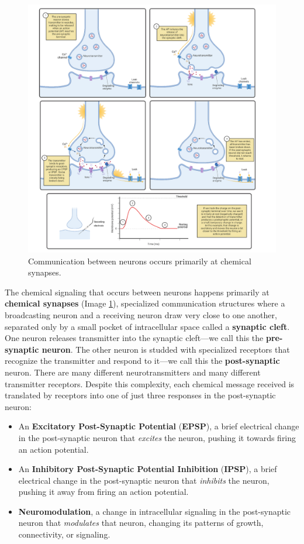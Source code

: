 \documentclass[
]{book}
\begin{document}
\begin{figure}

{\centering \includegraphics[width=0.9\linewidth]{images/ch02/02_02} 

}

\caption{Communication between neurons occurs primarily at chemical synapses.}\label{fig:ch02-02}
\end{figure}

The chemical signaling that occurs between neurons happens primarily at \textbf{chemical synapses} (Image \ref{fig:ch02-02}), specialized communication structures where a broadcasting neuron and a receiving neuron draw very close to one another, separated only by a small pocket of intracellular space called a \textbf{synaptic cleft}. One neuron releases transmitter into the synaptic cleft---we call this the \textbf{pre-synaptic neuron}. The other neuron is studded with specialized receptors that recognize the transmitter and respond to it---we call this the \textbf{post-synaptic} neuron. There are many different neurotransmitters and many different transmitter receptors. Despite this complexity, each chemical message received is translated by receptors into one of just three responses in the post-synaptic neuron:

\begin{itemize}
\item
  An \textbf{Excitatory Post-Synaptic Potential} (\textbf{EPSP}), a brief electrical change in the post-synaptic neuron that \emph{excites} the neuron, pushing it towards firing an action potential.
\item
  An \textbf{Inhibitory Post-Synaptic Potential Inhibition} (\textbf{IPSP}), a brief electrical change in the post-synaptic neuron that \emph{inhibits} the neuron, pushing it away from firing an action potential.
\item
  \textbf{Neuromodulation}, a change in intracellular signaling in the post-synaptic neuron that \emph{modulates} that neuron, changing its patterns of growth, connectivity, or signaling.
\end{itemize}
\end{document}
